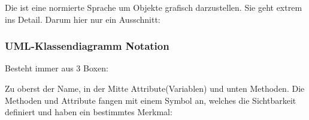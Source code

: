 Die  ist eine normierte Sprache um Objekte grafisch darzustellen. 
Sie geht extrem ins Detail. 
Darum hier nur ein Ausschnitt:

\subsubsection{UML-Klassendiagramm Notation}

Besteht immer aus 3 Boxen:\\

\noindent
\begin{minipage}{0.6\columnwidth}
\begin{center}
\end{center}
\end{minipage}
\begin{minipage}{0.4\columnwidth}

    Zu oberst der Name, in der Mitte Attribute(Variablen) und unten Methoden.
    Die Methoden und Attribute fangen mit einem Symbol an, welches die Sichtbarkeit definiert und haben ein bestimmtes Merkmal:

\end{minipage}

